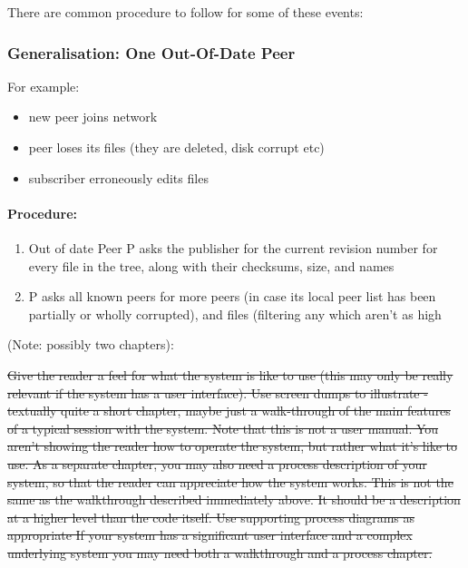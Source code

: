 \documentclass[12pt,a4paper,]{adreport}
\begin{document}
There are common procedure to follow for some of these events:

\subsubsection{Generalisation: One Out-Of-Date
Peer}\label{generalisation-one-out-of-date-peer}

For example:

\begin{itemize}
\itemsep1pt\parskip0pt
\item
  new peer joins network
\item
  peer loses its files (they are deleted, disk corrupt etc)
\item
  subscriber erroneously edits files
\end{itemize}

\paragraph{Procedure:}\label{procedure}

\begin{enumerate}
\def\labelenumi{\arabic{enumi}.}
\itemsep1pt\parskip0pt
\item
  Out of date Peer P asks the publisher for the current revision number
  for every file in the tree, along with their checksums, size, and
  names
\item
  P asks all known peers for more peers (in case its local peer list has
  been partially or wholly corrupted), and files (filtering any which
  aren't as high
\end{enumerate}

(Note: possibly two chapters):

\sout{Give the reader a feel for what the system is like to use (this
may only be really relevant if the system has a user interface). Use
screen dumps to illustrate - textually quite a short chapter, maybe just
a walk-through of the main features of a typical session with the
system. Note that this is not a user manual. You aren't showing the
reader how to operate the system, but rather what it's like to use. As a
separate chapter, you may also need a process description of your
system, so that the reader can appreciate how the system works. This is
not the same as the walkthrough described immediately above. It should
be a description at a higher level than the code itself. Use supporting
process diagrams as appropriate If your system has a significant user
interface and a complex underlying system you may need both a
walkthrough and a process chapter.}
\end{document}
